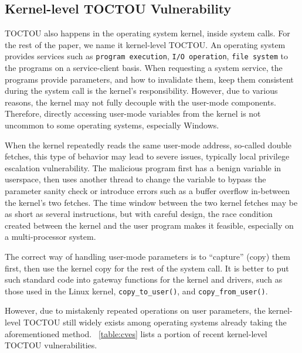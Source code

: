 \subsection{Kernel-level TOCTOU Vulnerability}


TOCTOU also happens in the operating system kernel, inside system calls. For the rest of the paper, we name it kernel-level TOCTOU. An operating system provides services such as \texttt{program execution}, \texttt{I/O operation}, \texttt{file system} to the programs on a service-client basis. When requesting a system service, the programs provide parameters, and how to invalidate them, keep them consistent during the system call is the kernel's responsibility. However, due to various reasons, the kernel may not fully decouple with the user-mode components. Therefore, directly accessing user-mode variables from the kernel is not uncommon to some operating systems, especially Windows.

When the kernel repeatedly reads the same user-mode address, so-called double fetches, this type of behavior may lead to severe issues, typically local privilege escalation vulnerability. The malicious program first has a benign variable in userspace, then uses another thread to change the variable to bypass the parameter sanity check or introduce errors such as a buffer overflow in-between the kernel's two fetches. The time window between the two kernel fetches may be as short as several instructions,  but with careful design, the race condition created between the kernel and the user program makes it feasible, especially on a multi-processor system.



The correct way of handling user-mode parameters is to ``capture'' (copy) them first, then use the kernel copy for the rest of the system call. It is better to put such standard code into gateway functions for the kernel and drivers, such as those used in the Linux kernel, \texttt{copy\_to\_user()}, and \texttt{copy\_from\_user()}.

However, due to mistakenly repeated operations on user parameters, the kernel-level TOCTOU still widely exists among operating systems already taking the aforementioned method. ~\autoref{table:cves} lists a portion of recent kernel-level TOCTOU vulnerabilities.


